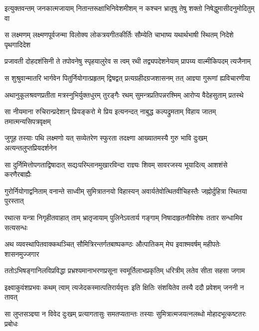 \fourlineindentedshloka
{इत्युक्तवन्तम् जनकात्मजायाम्}
{नितान्तरूक्षाभिनिवेशमीशम्}
{न कश्चन भ्रातृषु तेषु शक्तो}
{निषेद्धुमासीदनुमोदितुम् वा} %

\fourlineindentedshloka
{स लक्ष्मणम् लक्ष्मणपूर्वजन्मा}
{विलोक्य लोकत्रयगीतकीर्तिः}
{सौम्येति चाभाष्य यथार्थभाषी}
{स्थितम् निदेशे पृथगादिदेश} %

\fourlineindentedshloka
{प्रजावती दोहदशंसिनी ते}
{तपोवनेषु स्पृहयालुरेव}
{स त्वम् रथी तद्व्यपदेशनेयाम्}
{प्रापय्य वाल्मीकिपदम् त्यजैनाम्} %

\fourlineindentedshloka
{स शुश्रुवान्मातरि भार्गवेन}
{पितुर्नियोगात्प्रहृतम् द्विषद्वत्}
{प्रत्यग्रहीदग्रजशासनम् तत्}
{आज्ञ्या गुरूणां ह्यविचारणीया} %

\fourlineindentedshloka
{अथानुकूलश्रवणप्रतीता}
{मत्रस्नुभिर्युक्तधुरम् तुरङ्गैः}
{रथम् सुमन्त्रप्रतिपन्नरश्मिम्}
{आरोप्य वैदेहसुताम् प्रतस्थे} %

\fourlineindentedshloka
{सा नीयमाना रुचिरान्प्रदेशान्}
{प्रियङ्करो मे प्रिय इत्यनन्दत्}
{नाबुद्ध कल्पद्रुमताम् विहाय}
{जातम् तमात्मन्यसिपत्रवृक्षम्} %

\fourlineindentedshloka
{जुगूह तस्याः पथि लक्ष्मणो यत्}
{सव्येतरेण स्फुरता तदक्ष्णा}
{आख्यातमस्यै गुरु भावि दुःखम्}
{अत्यन्तलुप्तप्रियदर्शनेन} %

\fourlineindentedshloka
{सा दुर्निमित्तोपगताद्विषादात्}
{सद्यःपरिम्लानमुखारविन्दा}
{राज्ञ्यः शिवम् सावरजस्य भूयादित्य्}
{आशशंसे करणैरबाह्यैः} %

\fourlineindentedshloka
{गुरोर्नियोगाद्वनिताम् वनान्ते}
{साध्वीम् सुमित्रातनयो विहास्यन्}
{अवार्यतेवोत्थितवीचिहस्तैः}
{जह्नोर्दुहित्रा स्थितया पुरस्तात्} %

\fourlineindentedshloka
{रथात्स यन्त्रा निगृहीतवाहात्}
{ताम् भ्रातृजायाम् पुलिनेऽवतार्य}
{गङ्गाम् निषादाहृतनौविशेषः}
{ततार सन्धामिव सत्यसन्धः} %

\fourlineindentedshloka
{अथ व्यवस्थापितवाक्कथञ्चित्}
{सौमित्रिरन्तर्गतबाष्पकण्ठः}
{औत्पातिकम् मेघ इवाश्मवर्षम्}
{महीपतेः शासनमुज्जगार} %

\fourlineindentedshloka
{ततोऽभिषङ्गानिलविप्रविद्धा}
{प्रभ्रश्यमानाभरणप्रसूना}
{स्वमूर्तिलाभप्रकृतिम् धरित्रीम्}
{लतेव सीता सहसा जगाम} %

\fourlineindentedshloka
{इक्ष्वाकुवंशप्रभवः कथम् त्वाम्}
{त्यजेदकस्मात्पतिरार्यवृत्तः}
{इति क्षितिः संशयितेव तस्यै}
{ददौ प्रवेशम् जननी न तावत्} %

\fourlineindentedshloka
{सा लुप्तसञ्ज्ञ्या न विवेद दुःखम्}
{प्रत्यागतासुः समतप्यतान्तः}
{तस्याः सुमित्रात्मजयत्नलब्धो}
{मोहादभूत्कष्टतरः प्रबोधः} %

